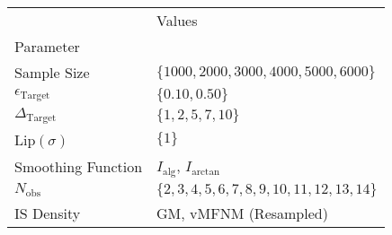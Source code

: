 \begin{tabular}{ll}
 & Values \\
Parameter &  \\
Sample Size & $\{ 1000, 2000, 3000, 4000, 5000, 6000 \}$ \\
\cline{1-2}
$\epsilon_{{\text{{Target}}}}$ & $\{ 0.10, 0.50 \}$ \\
\cline{1-2}
$\Delta_{{\text{{Target}}}}$ & $\{ 1, 2, 5, 7, 10 \}$ \\
\cline{1-2}
Lip$(\sigma)$ & $\{ 1 \}$ \\
\cline{1-2}
Smoothing Function & $I_\text{alg}$, $I_\text{arctan}$ \\
\cline{1-2}
$N_{{ \text{{obs}} }}$ & $\{ 2, 3, 4, 5, 6, 7, 8, 9, 10, 11, 12, 13, 14 \}$ \\
\cline{1-2}
IS Density & GM, vMFNM (Resampled) \\
\cline{1-2}
\end{tabular}
